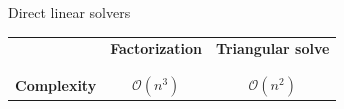\documentclass[aspectratio=169]{beamer}
\begin{document}
\begin{frame}[t, c]{Direct linear solvers}{}
  \vfill
  \centering
  \begin{tabular}{ccc}
    ~ & \textbf{Factorization} & \textbf{Triangular solve} \\ \\
    \hline \\
    \textbf{Complexity} & {\color{red}$\mathcal{O}(n^3)$} & $\mathcal{O}(n^2)$
  \end{tabular}
  \vfill
\end{frame}



\end{document}

